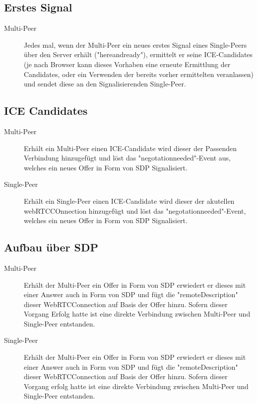 \subsection{Erstes Signal}
\begin{description}
\item[Multi-Peer]
Jedes mal, wenn der Multi-Peer ein neues erstes Signal eines Single-Peers über 
den Server erhält ("hereandready"), ermittelt er seine ICE-Candidates (je nach Browser kann dieses Vorhaben eine erneute Ermittlung der Candidates, oder ein Verwenden der bereits vorher ermittelten veranlassen) und sendet 
diese an den Signalisierenden Single-Peer.
\end{description}



\subsection{ICE Candidates}
\begin{description}
\item[Multi-Peer]
Erhält ein Multi-Peer einen ICE-Candidate wird dieser der Passenden Verbindung 
hinzugefügt und löst das "negotationneeded"-Event aus, welches ein neues Offer 
in Form von SDP Signalisiert.

\item[Single-Peer]
Erhält ein Single-Peer einen ICE-Candidate wird dieser der akutellen 
webRTCCOnnection hinzugefügt und löst das "negotationneeded"-Event, welches ein 
neues Offer in Form von SDP Signalisiert.
\end{description}



\subsection{Aufbau über SDP}
\begin{description}
\item[Multi-Peer]
Erhält der Multi-Peer ein Offer in Form von SDP erwiedert er dieses mit einer 
Answer auch in Form von SDP und fügt die "remoteDescription" dieser 
WebRTCConnection auf Basis der Offer hinzu. Sofern dieser Vorgang Erfolg hatte 
ist eine direkte Verbindung zwischen Multi-Peer und Single-Peer entstanden.

\item[Single-Peer]
Erhält der Multi-Peer ein Offer in Form von SDP erwiedert er dieses mit einer 
Answer auch in Form von SDP und fügt die "remoteDescription" dieser 
WebRTCConnection auf Basis der Offer hinzu. Sofern dieser Vorgang erfolg hatte 
ist eine direkte Verbindung zwischen Multi-Peer und Single-Peer entstanden.
\end{description}



